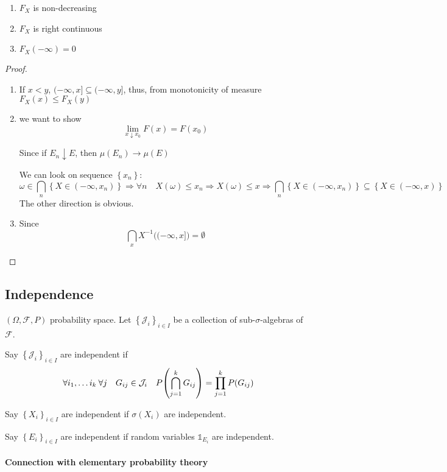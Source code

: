 \begin{prop}
\begin{enumerate}
	\item $F_X$ is non-decreasing
	\item $F_X$ is right continuous
	\item $F_X(-\infty) = 0$ 
\end{enumerate}
\begin{proof}
	
	\begin{enumerate}
		\item If $x<y$, $(-\infty, x] \subseteq (-\infty, y]$, thus, from monotonicity of measure $F_X(x)\leq F_X(y)$  
		\item we want to show
		$$\lim_{x\downarrow x_0} F(x) = F(x_0)$$
		
		Since if $E_n \downarrow E$, then $\mu(E_n) \to \mu(E)$
		
		We can look on sequence $\left\{ x_n\right\}$:
		$$\omega \in \bigcap_n \left\{ X \in (-\infty, x_n) \right\} \Rightarrow \forall n \quad X(\omega) \leq x_n \Rightarrow X(\omega) \leq x \Rightarrow \bigcap_n \left\{ X \in (-\infty, x_n) \right\} \subseteq \left\{ X \in (-\infty, x) \right\}$$
		The other direction is obvious.
		\item Since 
		$$\bigcap_x X^{-1}\big((-\infty,x]\big) = \emptyset$$
	\end{enumerate}
\end{proof}
\end{prop}

\subsection{Independence}
$(\Omega, \mathcal{F}, P)$ probability space.
Let $\left\{ \mathcal{J}_i \right\}_{i\in I}$ be a collection of sub-$\sigma$-algebras of $\mathcal{F}$.
\begin{definition}
	Say $\left\{ \mathcal{J}_i \right\}_{i\in I}$ are independent if
	$$\forall i_1, \dots i_k \: \forall j \quad G_{ij} \in  \mathcal{J}_i \quad P\qty(\bigcap_{j=1}^k G_{ij}) = \prod_{j=1}^k P(G_{ij})$$
\end{definition}
\begin{definition}
	Say $\left\{ X_i \right\}_{i\in I}$ are independent if $\sigma(X_i)$ are independent.
\end{definition}
\begin{definition}
Say $\left\{ E_i \right\}_{i\in I}$ are independent if random variables $\mathds{1}_{E_i}$ are independent.
\end{definition}

\paragraph{Connection with elementary probability theory}
